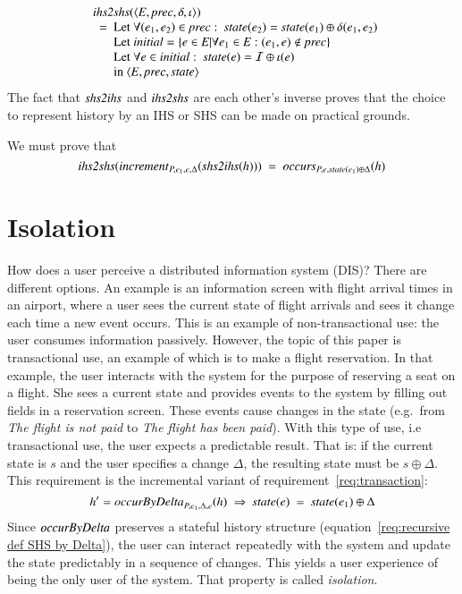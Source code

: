\documentclass{elsarticle}
\def\id#1{\text{\em #1\/}}
\def\Events{{\mathit E}}
\begin{document}
\begin{eqnarray}
&&\begin{array}{l}
	\id{ihs2shs}(\la\Events, \id{prec}, \delta, \iota\ra)\\
	\ \ =\ \begin{array}[t]{@{}l}
		\text{Let }\forall(e_1,e_2)\in\id{prec}:\ \id{state}(e_2)=\id{state}(e_1)\oplus\delta(e_1,e_2)\\
		\text{Let }\id{initial}=\{e\in\Events|\forall e_1\in\Events: (e_1,e)\notin\id{prec}\}\\
		\text{Let }\forall e\in\id{initial}:\ \id{state}(e)=\mathcal I\oplus\iota(e)\\
		\text{in }\la\Events, \id{prec}, \id{state}\ra
		\end{array}
\end{array}
\label{req:ihs2shs}
\end{eqnarray}
	The fact that $\id{shs2ihs}$ and $\id{ihs2shs}$ are each other's inverse proves that the choice to represent
	history by an IHS or SHS can be made on practical grounds.

	We must prove that
\begin{equation}
	\id{ihs2shs}(\id{increment}_{P,e_1,e,\Delta}(\id{shs2ihs}(h)))\ =\ \id{occurs}_{P,e,\id{state}(e_1)\oplus\Delta}(h)
\end{equation}

\section{Isolation}
\label{sct:Isolation}
	How does a user perceive a distributed information system (DIS)?
	There are different options.
	An example is an information screen with flight arrival times in an airport,
	where a user sees the current state of flight arrivals and sees it change each time a new event occurs.
	This is an example of non-transactional use: the user consumes information passively.
	However, the topic of this paper is transactional use,
	an example of which is to make a flight reservation.
	In that example, the user interacts with the system for the purpose of reserving a seat on a flight.
	She sees a current state and provides events to the system by filling out fields in a reservation screen.
	These events cause changes in the state (e.g.\ from {\em The flight is not paid} to {\em The flight has been paid}).
	With this type of use, i.e transactional use, the user expects a predictable result.
	That is: if the current state is $s$ and the user specifies a change $\Delta$,
	the resulting state must be $s\oplus\Delta$.
	This requirement is the incremental variant of requirement~\ref{req:transaction}:
\begin{equation}
	h'=\id{occurByDelta}_{P,e_1,\Delta,e}(h)\ \Rightarrow\ \id{state}(e)\ =\ \id{state}(e_1)\oplus\Delta
\label{req:occurByDelta}
\end{equation}
	Since $\id{occurByDelta}$ preserves a stateful history structure (equation~\ref{req:recursive def SHS by Delta}),
	the user can interact repeatedly with the system and update the state predictably in a sequence of changes.
	This yields a user experience of being the only user of the system.
	That property is called {\em isolation}.
\end{document}

